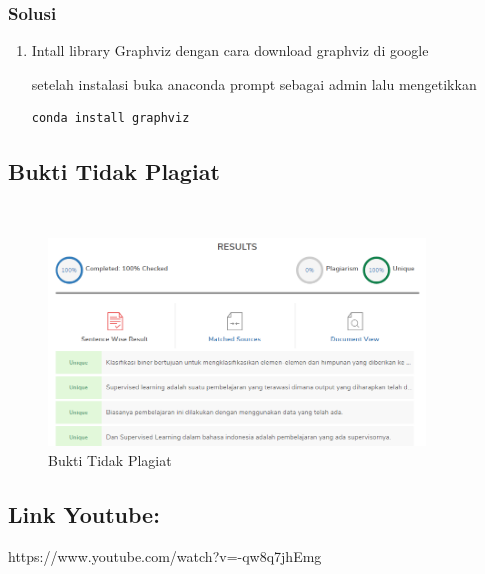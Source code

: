 \subsubsection{Solusi}
\begin{enumerate}
\item Intall library Graphviz dengan cara download graphviz di google

setelah instalasi buka anaconda prompt sebagai admin lalu mengetikkan
\begin{lstlisting}
conda install graphviz
\end{lstlisting} 
\end{enumerate}

\subsection{Bukti Tidak Plagiat}
\hfill\\
\begin{figure}[H]
\centerline{\includegraphics[width=10cm]{figures/1174087/2/plagiat.png}}
\caption{Bukti Tidak Plagiat}
\label{labelgambar}
\end{figure}

\subsection{Link Youtube:}
https://www.youtube.com/watch?v=-qw8q7jhEmg